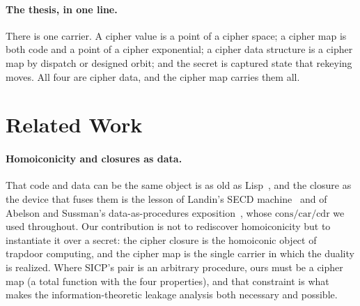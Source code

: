 \documentclass[11pt]{article}
\theoremstyle{definition}
\theoremstyle{plain}
\theoremstyle{definition}
\theoremstyle{remark}
\begin{document}
\paragraph{The thesis, in one line.} There is one carrier. A cipher
value is a point of a cipher space; a cipher map is both code and a
point of a cipher exponential; a cipher data structure is a cipher map
by dispatch or designed orbit; and the secret is captured state that
rekeying moves. All four are cipher data, and the cipher map carries
them all.

\section{Related Work}
\label{sec:related}

\paragraph{Homoiconicity and closures as data.} That code and data can
be the same object is as old as Lisp~\cite{mccarthy1960recursive}, and
the closure as the device that fuses them is the lesson of Landin's
SECD machine~\cite{landin1964mechanical} and of Abelson and Sussman's
data-as-procedures
exposition~\cite{abelson1996sicp}, whose $\mathrm{cons}/\mathrm{car}/
\mathrm{cdr}$ we used throughout. Our contribution is not to rediscover
homoiconicity but to instantiate it over a secret: the cipher closure
is the homoiconic object of trapdoor computing, and the cipher map is
the single carrier in which the duality is realized. Where SICP's pair
is an arbitrary procedure, ours must be a cipher map (a total function
with the four properties), and that constraint is what makes the
information-theoretic leakage analysis both necessary and possible.
\end{document}
